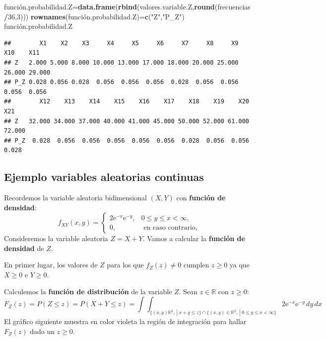 \documentclass[]{book}
\newenvironment{Shaded}{\begin{snugshade}}{\end{snugshade}}
\newcommand{\DecValTok}[1]{\textcolor[rgb]{0.00,0.00,0.81}{#1}}
\newcommand{\KeywordTok}[1]{\textcolor[rgb]{0.13,0.29,0.53}{\textbf{#1}}}
\newcommand{\NormalTok}[1]{#1}
\newcommand{\OperatorTok}[1]{\textcolor[rgb]{0.81,0.36,0.00}{\textbf{#1}}}
\newcommand{\StringTok}[1]{\textcolor[rgb]{0.31,0.60,0.02}{#1}}
\begin{document}
\begin{Shaded}
\begin{Highlighting}[]
\NormalTok{función.probabilidad.Z=}\KeywordTok{data.frame}\NormalTok{(}\KeywordTok{rbind}\NormalTok{(valores.variable.Z,}\KeywordTok{round}\NormalTok{(frecuencias}\OperatorTok{/}\DecValTok{36}\NormalTok{,}\DecValTok{3}\NormalTok{)))}
\KeywordTok{rownames}\NormalTok{(función.probabilidad.Z)=}\KeywordTok{c}\NormalTok{(}\StringTok{"Z"}\NormalTok{,}\StringTok{"P_Z"}\NormalTok{)}
\NormalTok{función.probabilidad.Z}
\end{Highlighting}
\end{Shaded}

\begin{verbatim}
##        X1    X2    X3     X4     X5     X6     X7     X8     X9    X10    X11
## Z   2.000 5.000 8.000 10.000 13.000 17.000 18.000 20.000 25.000 26.000 29.000
## P_Z 0.028 0.056 0.028  0.056  0.056  0.056  0.028  0.056  0.056  0.056  0.056
##        X12    X13    X14    X15    X16    X17    X18    X19    X20    X21
## Z   32.000 34.000 37.000 40.000 41.000 45.000 50.000 52.000 61.000 72.000
## P_Z  0.028  0.056  0.056  0.056  0.056  0.056  0.028  0.056  0.056  0.028
\end{verbatim}

\hypertarget{ejemplo-variables-aleatorias-continuas}{%
\subsection{Ejemplo variables aleatorias continuas}\label{ejemplo-variables-aleatorias-continuas}}

Recordemos la variable aleatoria bidimensional \((X,Y)\) con \textbf{función de densidad}:
\[
f_{XY}(x,y)=\begin{cases}
2 \mathrm{e}^{-x}\mathrm{e}^{-y}, & 0\leq y\leq x < \infty,\\
0, & \mbox{ en caso contrario,}
\end{cases}
\]
Consideremos la variable aleatoria \(Z=X+Y\). Vamos a calcular la \textbf{función de densidad} de \(Z\).

En primer lugar, los valores de \(Z\) para los que \(f_Z(z)\neq 0\) cumplen \(z\geq 0\) ya que \(X\geq 0\) e \(Y\geq 0\).

Calculemos la \textbf{función de distribución} de la variable \(Z\). Sean \(z\in\mathbb{R}\) con \(z\geq 0\):
\[
F_Z(z)=P(Z\leq z)=P(X+Y\leq z)=\int\int_{\{(x,y)\mathbb{R}^2,\ |\ x+y\leq z\}\cap \{(x,y)\in \mathbb{R}^2,\ |\ 0\leq y\leq x<\infty\}} 2 \mathrm{e}^{-x}\mathrm{e}^{-y}\, dy\, dx
\]
El gráfico siguiente muestra en color violeta la región de integración para hallar \(F_Z(z)\) dado un \(z\geq 0\).
\end{document}
